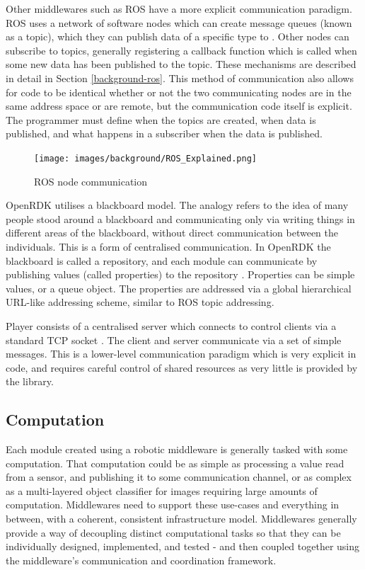 \documentclass[../dissertation.tex]{subfiles}
\begin{document}
Other middlewares such as ROS have a more explicit communication paradigm. ROS uses a network of software nodes which can create message queues (known as a topic), which they can publish data of a specific type to \cite{rosconcepts}. Other nodes can subscribe to topics, generally registering a callback function which is called when some new data has been published to the topic. These mechanisms are described in detail in Section \ref{background-ros}. This method of communication also allows for code to be identical whether or not the two communicating nodes are in the same address space or are remote, but the communication code itself is explicit. The programmer must define when the topics are created, when data is published, and what happens in a subscriber when the data is published.

\begin{figure}[H]
\centering
\texttt{[image: images/background/ROS\_Explained.png]}
\caption{ROS node communication}
\end{figure}

OpenRDK utilises a blackboard model. The analogy refers to the idea of many people stood around a blackboard and communicating only via writing things in different areas of the blackboard, without direct communication between the individuals. This is a form of centralised communication. In OpenRDK the blackboard is called a repository, and each module can communicate by publishing values (called properties) to the repository \cite{OpenRDKIntro}. Properties can be simple values, or a queue object. The properties are addressed via a global hierarchical URL-like addressing scheme, similar to ROS topic addressing.

Player consists of a centralised server which connects to control clients via a standard TCP socket \cite{PlayerServerManual}. The client and server communicate via a set of simple messages. This is a lower-level communication paradigm which is very explicit in code, and requires careful control of shared resources as very little is provided by the library.

\subsection{Computation}

Each module created using a robotic middleware is generally tasked with some computation. That computation could be as simple as processing a value read from a sensor, and publishing it to some communication channel, or as complex as a multi-layered object classifier for images requiring large amounts of computation. Middlewares need to support these use-cases and everything in between, with a coherent, consistent infrastructure model. Middlewares generally provide a way of decoupling distinct computational tasks so that they can be individually designed, implemented, and tested - and then coupled together using the middleware's communication and coordination framework.
\end{document}
